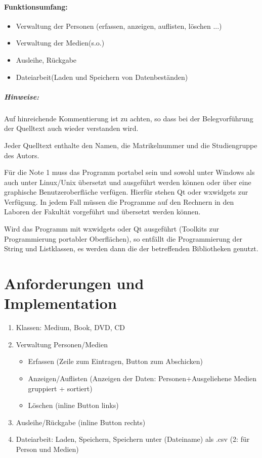 \paragraph{Funktionsumfang:}
\begin{itemize}
\item Verwaltung der Personen (erfassen, anzeigen, auflisten, löschen ...)
\item Verwaltung der Medien(s.o.)
\item Ausleihe, Rückgabe
\item Dateiarbeit(Laden und Speichern von Datenbeständen)
\end{itemize}
\subparagraph{Hinweise:}
Auf hinreichende Kommentierung ist zu achten, so dass bei der Belegvorführung der Quelltext auch wieder verstanden wird.

Jeder Quelltext enthalte den Namen, die Matrikelnummer und die Studiengruppe des Autors.

Für die Note 1 muss das Programm portabel sein und sowohl unter Windows als auch unter Linux/Unix übersetzt und ausgeführt werden können oder über eine graphische Benutzeroberfläche verfügen. Hierfür stehen Qt oder wxwidgets zur Verfügung. In jedem Fall müssen die Programme auf den Rechnern in den Laboren der Fakultät vorgeführt und übersetzt werden können.

Wird das Programm mit wxwidgets oder Qt ausgeführt (Toolkits zur Programmierung portabler Oberflächen), so entfällt die Programmierung der String und Listklassen, es werden dann die der betreffenden Bibliotheken genutzt.

\section*{Anforderungen und Implementation}
\begin{enumerate}
\item Klassen: Medium, Book, DVD, CD
\item Verwaltung Personen/Medien
\begin{itemize}
\item Erfassen (Zeile zum Eintragen, Button zum Abschicken)
\item Anzeigen/Auflisten (Anzeigen der Daten: Personen+Ausgeliehene Medien gruppiert + sortiert)
\item Löschen (inline Button links)
\end{itemize}
\item Ausleihe/Rückgabe (inline Button rechts)
\item Dateiarbeit: Laden, Speichern, Speichern unter (Dateiname) als .csv (2: für Person und Medien)
\end{enumerate}

